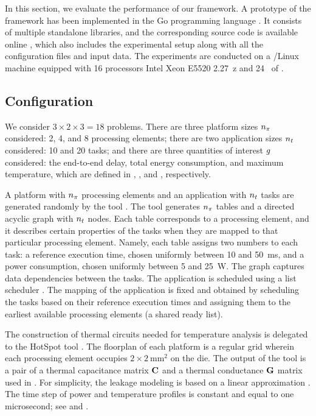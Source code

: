 In this section, we evaluate the performance of our framework. A prototype of
the framework has been implemented in the Go programming language \cite{go}. It
consists of multiple standalone libraries, and the corresponding source code is
available online \cite{sources}, which also includes the experimental setup
along with all the configuration files and input data. The experiments are
conducted on a /Linux machine equipped with 16 processors Intel Xeon
E5520 2.27~z and 24~ of .

\subsection{Configuration}

We consider $3 \times 2 \times 3 = 18$ problems. There are three platform sizes
${n_\pi}$ considered: 2, 4, and 8 processing elements; there are two application
sizes ${n_t}$ considered: 10 and 20 tasks; and there are three quantities of
interest $g$ considered: the end-to-end delay, total energy consumption, and
maximum temperature, which are defined in ,
, and , respectively.

A platform with ${n_\pi}$ processing elements and an application with ${n_t}$ tasks
are generated randomly by the  tool \cite{dick1998}. The tool generates
${n_\pi}$ tables and a directed acyclic graph with ${n_t}$ nodes. Each table
corresponds to a processing element, and it describes certain properties of the
tasks when they are mapped to that particular processing element. Namely, each
table assigns two numbers to each task: a reference execution time, chosen
uniformly between 10 and 50~ms, and a power consumption, chosen uniformly
between 5 and 25~W. The graph captures data dependencies between the tasks. The
application is scheduled using a list scheduler \cite{adam1974}. The mapping of
the application is fixed and obtained by scheduling the tasks based on their
reference execution times and assigning them to the earliest available
processing elements (a shared ready list).

The construction of thermal  circuits needed for temperature analysis is
delegated to the HotSpot tool \cite{skadron2004}. The floorplan of each platform
is a regular grid wherein each processing element occupies $2 \times
2~\text{mm}^2$ on the die. The output of the tool is a pair of a thermal
capacitance matrix $\mathbf{C}$ and a thermal conductance $\mathbf{G}$ matrix used in
. For simplicity, the leakage modeling is based on a linear
approximation \cite{yang2013, ukhov2012, liu2007}. The time step of power and
temperature profiles is constant and equal to one microsecond; see 
and .

